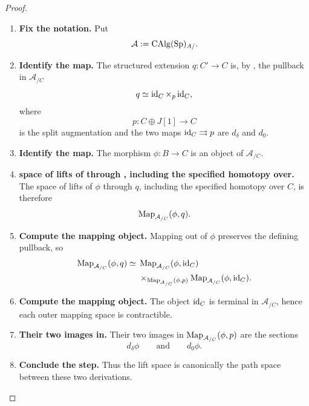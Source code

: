 \begin{proof}
\leavevmode
\begin{enumerate}[label=\textup{(\arabic*)}]
    \item \textbf{Fix the notation.}
    Put
    \[
        \mathcal A:=\operatorname{CAlg}(\operatorname{Sp})_{A/}.
    \]

    \item \textbf{Identify the map.}
    The structured extension \(q:C'\to C\) is, by , the
    pullback in \(\mathcal A_{/C}\)
    \[
        q
        \simeq
        \operatorname{id}_C\times_p\operatorname{id}_C,
    \]
    where
    \[
        p:C\oplus J[1]\longrightarrow C
    \]
    is the split augmentation and the two maps \(\operatorname{id}_C\rightrightarrows p\) are \(d_\delta\) and \(d_0\).

    \item \textbf{Identify the map.}
    The morphism \(\phi:B\to C\) is an object of \(\mathcal A_{/C}\).

    \item \textbf{space of lifts of through , including the specified homotopy over.}
    The space of lifts of \(\phi\) through \(q\), including the specified homotopy over
    \(C\), is therefore
    \[
        \operatorname{Map}_{\mathcal A_{/C}}(\phi,q).
    \]

    \item \textbf{Compute the mapping object.}
    Mapping out of \(\phi\) preserves the defining pullback, so
    \[
    \begin{aligned}
        \operatorname{Map}_{\mathcal A_{/C}}(\phi,q)
        \simeq{}&
        \operatorname{Map}_{\mathcal A_{/C}}(\phi,\operatorname{id}_C)
        \\
        &\times_{\operatorname{Map}_{\mathcal A_{/C}}(\phi,p)}
        \operatorname{Map}_{\mathcal A_{/C}}(\phi,\operatorname{id}_C).
    \end{aligned}
    \]

    \item \textbf{Compute the mapping object.}
    The object \(\operatorname{id}_C\) is terminal in \(\mathcal A_{/C}\), hence each outer mapping space is
    contractible.

    \item \textbf{Their two images in.}
    Their two images in \(\operatorname{Map}_{\mathcal A_{/C}}(\phi,p)\) are the sections
    \[
        d_\delta\phi
        \qquad\text{and}\qquad
        d_0\phi.
    \]

    \item \textbf{Conclude the step.}
    Thus the lift space is canonically the path space between these two derivations.


\end{enumerate}
\end{proof}
